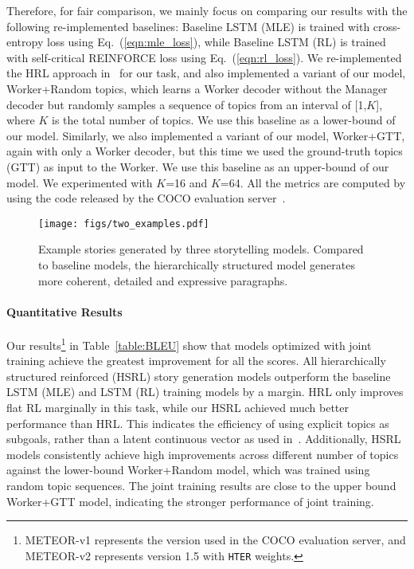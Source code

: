 \documentclass[letterpaper]{article} \usepackage{aaai19}  \usepackage{times}  \usepackage{helvet}  \usepackage{courier}  \usepackage{url}  \usepackage{graphicx}
\begin{document}
Therefore, for fair comparison, we mainly focus on comparing our results with the following re-implemented baselines: Baseline LSTM (MLE) is trained with cross-entropy loss using Eq.~(\ref{eqn:mle_loss}), while Baseline LSTM (RL) is trained with self-critical REINFORCE loss using Eq.~(\ref{eqn:rl_loss}). We re-implemented the HRL approach in~\cite{wang2018video} for our task, and also implemented a variant of our model, Worker+Random topics, which learns a Worker decoder without the Manager decoder but randomly samples a sequence of topics from an interval of [1,$K$], where $K$ is the total number of topics. We use this baseline as a lower-bound of our model. 
Similarly, we also implemented a variant of our model, Worker+GTT, again with only a Worker decoder, but this time we used the ground-truth topics (GTT) as input to the Worker. We use this baseline as an upper-bound of our model. We experimented with $K$=16 and $K$=64. 
All the metrics are computed by using the code released by the COCO evaluation server~\cite{chen2015microsoft}.


\begin{figure*}[t]
	\centering
	\texttt{[image: figs/two\_examples.pdf]}
	\caption{\small Example stories generated by three storytelling models. Compared to baseline models, the hierarchically structured model generates more coherent, detailed and expressive paragraphs.}
	\label{fig:stories}
\end{figure*}

\paragraph{Quantitative Results} 
Our results\footnote{METEOR-v1 represents the version used in the COCO evaluation server, and METEOR-v2 represents version 1.5 with \texttt{HTER} weights.} in Table~\ref{table:BLEU} show that models optimized with joint training achieve the greatest improvement for all the scores.
All hierarchically structured reinforced (HSRL) story generation models outperform the baseline LSTM (MLE) and LSTM (RL) training models by a margin. HRL only improves flat RL marginally in this task, while our HSRL achieved much better performance than HRL.
This indicates the efficiency of using explicit topics as subgoals, rather than a latent continuous vector as used in~\cite{wang2018video}.
Additionally, HSRL models consistently achieve high improvements across different number of topics against the lower-bound Worker+Random model, which was trained using random topic sequences. The joint training results are close to the upper bound Worker+GTT model, indicating the stronger performance of joint training.
\end{document}
